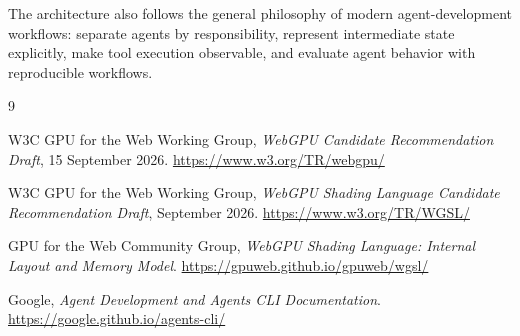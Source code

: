 \documentclass[11pt,a4paper,oneside]{report}
\begin{document}
The architecture also follows the general philosophy of modern agent-development workflows:
separate agents by responsibility, represent intermediate state explicitly, make tool execution
observable, and evaluate agent behavior with reproducible workflows.

\begin{thebibliography}{9}

W3C GPU for the Web Working Group,
\emph{WebGPU Candidate Recommendation Draft},
15 September 2026.
\url{https://www.w3.org/TR/webgpu/}

W3C GPU for the Web Working Group,
\emph{WebGPU Shading Language Candidate Recommendation Draft},
September 2026.
\url{https://www.w3.org/TR/WGSL/}

GPU for the Web Community Group,
\emph{WebGPU Shading Language: Internal Layout and Memory Model}.
\url{https://gpuweb.github.io/gpuweb/wgsl/}

Google,
\emph{Agent Development and Agents CLI Documentation}.
\url{https://google.github.io/agents-cli/}

\end{thebibliography}
\end{document}
